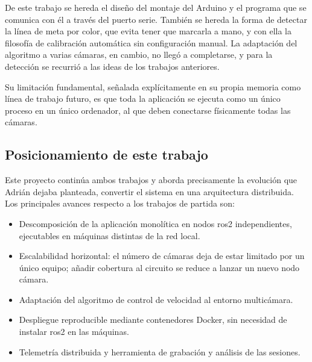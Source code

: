 De este trabajo se hereda el diseño del montaje del Arduino y el programa que se comunica con él a través del puerto serie. También se hereda la forma de detectar la línea de meta por color, que evita tener que marcarla a mano, y con ella la filosofía de calibración automática sin configuración manual. La adaptación del algoritmo a varias cámaras, en cambio, no llegó a completarse, y para la detección se recurrió a las ideas de los trabajos anteriores.

Su limitación fundamental, señalada explícitamente en su propia memoria como línea de trabajo futuro, es que toda la aplicación se ejecuta como un único proceso en un único ordenador, al que deben conectarse físicamente todas las cámaras.

\subsection{Posicionamiento de este trabajo}
\label{sec:posicionamento}

Este proyecto continúa ambos trabajos y aborda precisamente la evolución que Adrián dejaba planteada, convertir el sistema en una arquitectura distribuida. Los principales avances respecto a los trabajos de partida son:

\begin{itemize}
    \item Descomposición de la aplicación monolítica en nodos \gls{ros2} independientes, ejecutables en máquinas distintas de la red local.

    \item Escalabilidad horizontal: el número de cámaras deja de estar limitado por un único equipo; añadir cobertura al circuito se reduce a lanzar un nuevo nodo cámara.

    \item Adaptación del algoritmo de control de velocidad al entorno multicámara.

    \item Despliegue reproducible mediante contenedores Docker, sin necesidad de instalar \gls{ros2} en las máquinas.

    \item Telemetría distribuida y herramienta de grabación y análisis de las sesiones.
\end{itemize}
